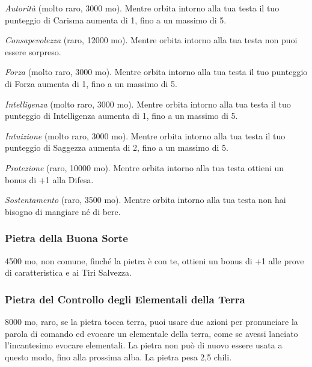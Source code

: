 \begin{multicols}{2}
	\textit{Autorità} (molto raro, 3000 mo). Mentre orbita intorno alla tua testa il tuo punteggio di Carisma aumenta di 1, fino a un massimo di 5.

	\textit{Consapevolezza} (raro, 12000 mo). Mentre orbita intorno alla tua testa non puoi essere sorpreso.

	\textit{Forza} (molto raro, 3000 mo). Mentre orbita intorno alla tua testa il tuo punteggio di Forza aumenta di 1, fino a un massimo di 5.

	\textit{Intelligenza} (molto raro, 3000 mo). Mentre orbita intorno alla tua testa il tuo punteggio di Intelligenza aumenta di 1, fino a un massimo di 5.

	\textit{Intuizione} (molto raro, 3000 mo). Mentre orbita intorno alla tua testa il tuo punteggio di Saggezza aumenta di 2, fino a un massimo di 5.

	\textit{Protezione} (raro, 10000 mo). Mentre orbita intorno alla tua testa ottieni un bonus di +1 alla Difesa.

	\textit{Sostentamento} (raro, 3500 mo). Mentre orbita intorno alla tua testa non hai bisogno di mangiare né di bere.

	\subsubsection*{Pietra della Buona Sorte}
	4500 mo, non comune, finché la pietra è con te, ottieni un bonus di +1 alle prove di caratteristica e ai Tiri Salvezza.

	\subsubsection*{Pietra del Controllo degli Elementali della Terra}
	8000 mo, raro, se la pietra tocca terra, puoi usare due azioni per pronunciare la parola di comando ed evocare un elementale della terra, come se avessi lanciato l'incantesimo evocare elementali. La pietra non può di nuovo essere usata a questo modo, fino alla prossima alba. La pietra pesa 2,5 chili.


\end{multicols}
